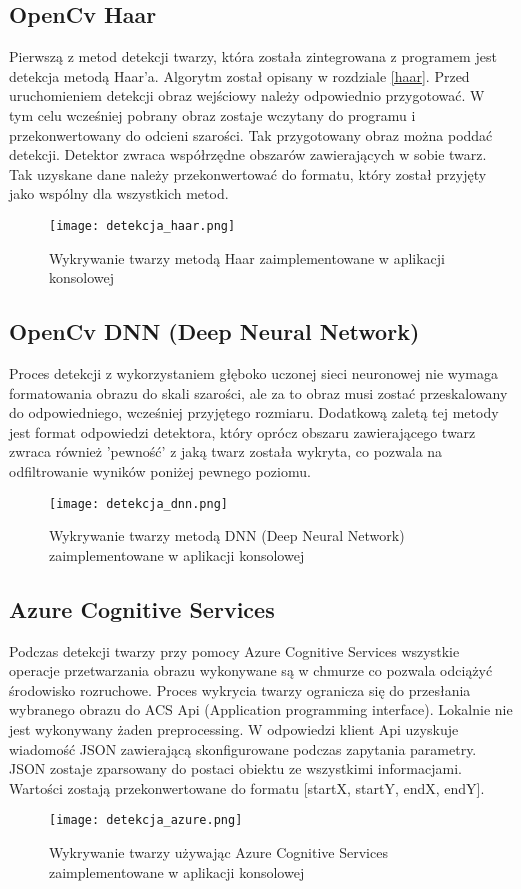\subsection{OpenCv Haar} \label{detekcja_haar}
Pierwszą z metod detekcji twarzy, która została zintegrowana z programem jest detekcja metodą Haar'a. Algorytm został opisany w rozdziale \ref{haar}. Przed uruchomieniem detekcji obraz wejściowy należy odpowiednio przygotować. W tym celu wcześniej pobrany obraz zostaje wczytany do programu i przekonwertowany do odcieni szarości. Tak przygotowany obraz można poddać detekcji. Detektor zwraca współrzędne obszarów zawierających w sobie twarz. Tak uzyskane dane należy przekonwertować do formatu, który został przyjęty jako wspólny dla wszystkich metod.
\begin{figure}[H]
	\centering
	\texttt{[image: detekcja\_haar.png]}
	\caption{Wykrywanie twarzy metodą Haar zaimplementowane w aplikacji konsolowej}
	\label{fig:wykrywanie_haar}
\end{figure}

\subsection{OpenCv DNN (Deep Neural Network)} \label{detekcja_dnn}
Proces detekcji z wykorzystaniem głęboko uczonej sieci neuronowej nie wymaga formatowania obrazu do skali szarości, ale za to obraz musi zostać przeskalowany do odpowiedniego, wcześniej przyjętego rozmiaru. Dodatkową zaletą tej metody jest format odpowiedzi detektora, który oprócz obszaru zawierającego twarz zwraca również 'pewność' z jaką twarz została wykryta, co pozwala na odfiltrowanie wyników poniżej pewnego poziomu.
\begin{figure}[H]
	\centering
	\texttt{[image: detekcja\_dnn.png]}
	\caption{Wykrywanie twarzy metodą DNN (Deep Neural Network) zaimplementowane w aplikacji konsolowej}
	\label{fig:wykrywanie_dnn}
\end{figure}

\subsection{Azure Cognitive Services} \label{detekcja_azure}
Podczas detekcji twarzy przy pomocy Azure Cognitive Services wszystkie operacje przetwarzania obrazu wykonywane są w chmurze co pozwala odciążyć środowisko rozruchowe. Proces wykrycia twarzy ogranicza się do przesłania wybranego obrazu do ACS Api (Application programming interface). Lokalnie nie jest wykonywany żaden preprocessing. W odpowiedzi klient Api uzyskuje wiadomość JSON zawierającą skonfigurowane podczas zapytania parametry. JSON zostaje zparsowany do postaci obiektu ze wszystkimi informacjami. Wartości zostają przekonwertowane do formatu [startX, startY, endX, endY].
\begin{figure}[H]
	\centering
	\texttt{[image: detekcja\_azure.png]}
	\caption{Wykrywanie twarzy używając Azure Cognitive Services zaimplementowane w aplikacji konsolowej}
	\label{fig:wykrywanie_azure}
\end{figure}

